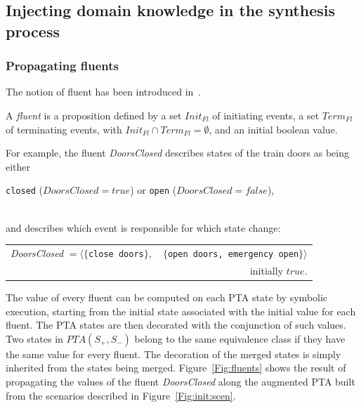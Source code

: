 \subsection{Injecting domain knowledge in the synthesis process\label{subsection:induction-pruning-with-domain-knowledge}}

\subsubsection*{Propagating fluents}

The notion of fluent has been introduced in~\cite{Giannakopoulou:2003}.

\begin{definition}[Fluent]
A \emph{fluent} 
is a proposition defined by a set $Init_{Fl}$ of initiating events, a set $Term_{Fl}$ of 
terminating events, with $Init_{Fl}\cap Term_{Fl} = \emptyset$, and an initial boolean value.
\end{definition}

\noindent
For example, the fluent \emph{DoorsClosed} describes states of the train doors as being either \\
\centerline{\texttt{closed} ($DoorsClosed = true$) or \texttt{open} ($DoorsClosed = false$),} \\
and describes which event is responsible for which state change:

\hspace*{-.5cm}
\begin{small}
\begin{tabular}{lr}
\emph{DoorsClosed} $=\langle\{$\texttt{close doors}$\},$ &$\{$\texttt{open doors, emergency open}$\}\rangle$\\
&initially $true$.\\
\end{tabular}
\end{small}

The value of every fluent can be computed on each PTA state by symbolic execution, starting from the initial state associated with the initial value for each fluent. The PTA states are then decorated with the conjunction of such values. Two states in $PTA(S_+, S_-)$ belong to the same equivalence class if they have the same value for every fluent. The decoration of the merged states is simply inherited from the states being merged. Figure~\ref{Fig:fluents} shows the result of propagating the values of the fluent \emph{DoorsClosed} along the augmented PTA built from the scenarios described in Figure~\ref{Fig:init:scen}.

